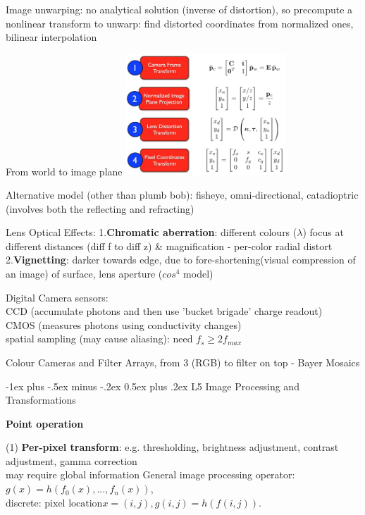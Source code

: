 \documentclass[10pt,landscape]{article}
\makeatletter
\renewcommand{\section}{\@startsection{section}{1}{0mm}%
                                {-1ex plus -.5ex minus -.2ex}%
                                {0.5ex plus .2ex}%
                                {\normalfont\large\bfseries}}
\makeatother
\begin{document}
\begin{multicols}{3}
Image unwarping: no analytical solution (inverse of distortion), so precompute a nonlinear transform to unwarp:  find distorted coordinates from normalized ones, bilinear interpolation

From world to image plane
\includegraphics[width=6cm]{images/world_to_image.png}

Alternative model (other than plumb bob): fisheye, omni-directional, catadioptric (involves both the reflecting and refracting)

Lens Optical Effects:
1.\textbf{Chromatic aberration}: different colours ($\lambda$) focus at different distances (diff f to diff z) \& magnification - per-color radial distort 
2.\textbf{Vignetting}: darker towards edge, due to fore-shortening(visual compression of an image) of surface, lens aperture ($cos^4$ model)

Digital Camera sensors:\\
CCD (accumulate photons and then use 'bucket brigade' charge readout)\\
CMOS (measures photons using conductivity changes)\\

spatial sampling (may cause aliasing): need $f_s \geq 2f_{max}$

Colour Cameras and Filter Arrays, from 3 (RGB) to filter on top - Bayer Mosaics

\section{L5 Image Processing and Transformations}

\textbf{Point operation}

(1) \textbf{Per-pixel transform}: 
e.g. thresholding, brightness adjustment, contrast adjustment, gamma correction\\
may require global information
General image processing operator: $g(x) = h(f_0(x), ..., f_n(x))$,\\
discrete: $\text{pixel location} x = (i,j), g(i,j) = h(f(i,j)).$ \\


\end{multicols}
\end{document}
